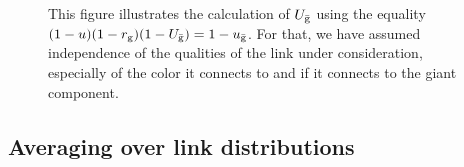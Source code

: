 \documentclass[aps, pre, onecolumn, a4paper, floatfix]{revtex4}
\begin{document}
\begin{figure}[htb]
\begin{minipage}[b]{0.22\linewidth}
\begin{center}
   \end{center}
  \end{minipage}
    \caption{This figure illustrates the calculation of $U_{\bar{\rm g}}$ 
    using the equality $(1-u)(1-r_{\rm g})(1-U_{\bar{\rm g}})=1-u_{\bar{\rm g}}$. For 
    that, we have assumed independence of the qualities of the link under 
    consideration, especially of the color it connects to and if it connects to 
    the giant component. }
    \label{fig:1}
\end{figure}



\subsection{Averaging over link distributions}
\end{document}
